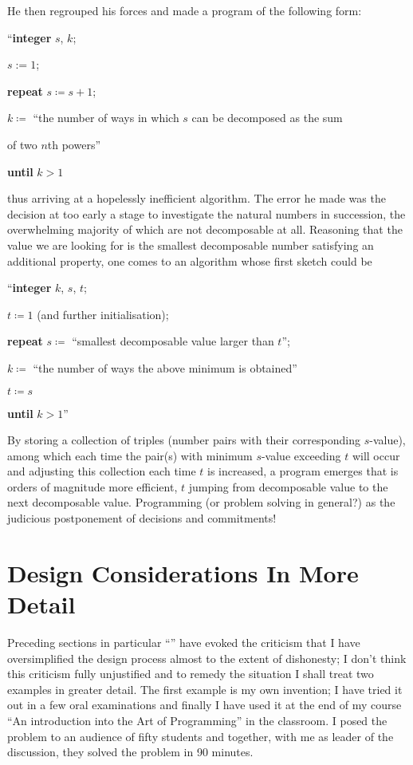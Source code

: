 He then regrouped his forces and made a program of the following form:

\quad \hspace{-.4em}``\textbf{integer} $s$, $k$;

\quad $s:= 1$;

\quad \textbf{repeat} $s\coloneq s + 1$;

\quad \quad $k\coloneq$ ``the number of ways in which $s$ can be decomposed as the sum

\quad \quad\quad of two $n$th powers''

\quad \textbf{until} $k > 1$

\noindent
thus arriving at a hopelessly inefficient algorithm. The error he made was the decision at too early a stage to investigate the natural numbers in succession, the overwhelming majority of which are not decomposable at all. Reasoning that the value we are looking for is the smallest decomposable number satisfying an additional property, one comes to an algorithm whose first sketch could be

\quad \hspace{-.4em}``\textbf{integer} $k$, $s$, $t$;

\quad $t \coloneq 1$ (and further initialisation);

\quad \textbf{repeat} $s \coloneq$ ``smallest decomposable value larger than $t$'';

\quad \quad $k \coloneq$ ``the number of ways the above minimum is obtained''

\quad \quad $t \coloneq s$

\quad \textbf{until} $k > 1$''

By storing a collection of triples (number pairs with their corresponding $s$-value), among which each time the pair(s) with minimum $s$-value exceeding $t$ will occur and adjusting this collection each time $t$ is increased, a program emerges that is orders of magnitude more efficient, $t$ jumping from decomposable value to the next decomposable value. Programming (or problem solving in general?) as the judicious postponement of decisions and commitments!

\section[Design considerations in more detail]{Design Considerations In More Detail}

Preceding sections \textemdash{}  in particular ``'' have evoked the criticism that I have oversimplified the design process almost to the extent of dishonesty; I don't think this criticism fully unjustified and to remedy the situation I shall treat two examples in greater detail. The first example is my own invention; I have tried it out in a few oral examinations and finally I have used it at the end of my course ``An introduction into the Art of Programming'' in the classroom. I posed the problem to an audience of fifty students and together, with me as leader of the discussion, they solved the problem in 90 minutes.

